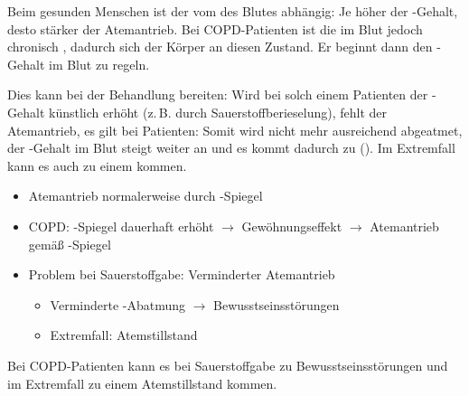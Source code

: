 {%
Beim gesunden Menschen ist der  vom  des Blutes abhängig: 
%
Je höher der -Gehalt, desto stärker der Atemantrieb.
%
Bei COPD-Patienten ist die  im Blut jedoch chronisch , 
dadurch  sich der Körper an diesen Zustand. 
%
Er beginnt dann den -Gehalt im Blut zu
regeln.


%
Dies kann bei der Behandlung  bereiten: 
Wird bei solch einem Patienten der -Gehalt künstlich erhöht
(z.\,B. durch Sauerstoffberieselung), 
fehlt der Atemantrieb, es gilt bei  Patienten:
%
Somit wird  nicht mehr ausreichend abgeatmet,
der -Gehalt im Blut steigt weiter an 
und es kommt dadurch zu 
().
%
Im Extremfall kann es auch zu einem 
kommen.
}{
\begin{itemize}
  \item Atemantrieb normalerweise durch -Spiegel
  \item COPD: -Spiegel dauerhaft erhöht
  $\rightarrow$ Gewöhnungseffekt 
  $\rightarrow$ Atemantrieb gemäß -Spiegel
  \item Problem bei Sauerstoffgabe: Verminderter Atemantrieb
  \begin{itemize}
    \item Verminderte -Abatmung $\rightarrow$ Bewusstseinsstörungen
    \item Extremfall: Atemstillstand
  \end{itemize}
\end{itemize}


\SymbolText
}{}{}{}

\begin{Danger}
  \item {Bei COPD-Patienten kann es bei Sauerstoffgabe zu Bewusstseinsstörungen und im Extremfall zu einem Atemstillstand kommen.}
\end{Danger}

%

